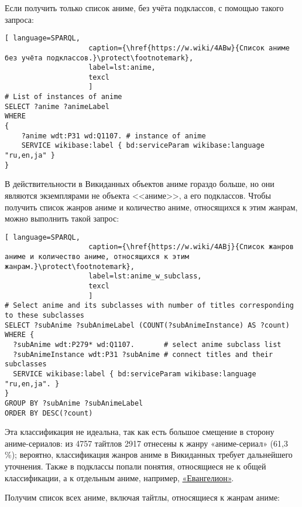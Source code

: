 Если получить только список аниме, без учёта подклассов, с помощью такого запроса:

\begin{lstlisting}[ language=SPARQL, 
                    caption={\href{https://w.wiki/4ABw}{Список аниме без учёта подклассов.}\protect\footnotemark},
                    label=lst:anime,
                    texcl 
                    ]
# List of instances of anime
SELECT ?anime ?animeLabel
WHERE
{
    ?anime wdt:P31 wd:Q1107. # instance of anime
    SERVICE wikibase:label { bd:serviceParam wikibase:language "ru,en,ja" }
}
\end{lstlisting}%

В действительности в Викиданных объектов аниме гораздо больше, но они являются экземплярами не объекта <<аниме>>, а его подклассов. Чтобы получить список жанров аниме и количество аниме, относящихся к этим жанрам, можно выполнить такой запрос:

\begin{lstlisting}[ language=SPARQL, 
                    caption={\href{https://w.wiki/4ABj}{Список жанров аниме и количество аниме, относящихся к этим жанрам.}\protect\footnotemark},
                    label=lst:anime_w_subclass,
                    texcl 
                    ]
# Select anime and its subclasses with number of titles corresponding to these subclasses
SELECT ?subAnime ?subAnimeLabel (COUNT(?subAnimeInstance) AS ?count) WHERE {
  ?subAnime wdt:P279* wd:Q1107.       # select anime subclass list
  ?subAnimeInstance wdt:P31 ?subAnime # connect titles and their subclasses
  SERVICE wikibase:label { bd:serviceParam wikibase:language "ru,en,ja". }
}
GROUP BY ?subAnime ?subAnimeLabel
ORDER BY DESC(?count)
\end{lstlisting}%

Эта классификация не идеальна, так как есть большое смещение в сторону аниме-сериалов: из 4757 тайтлов 2917 отнесены к жанру «аниме-сериал» (61,3 \%); вероятно, классификация жанров аниме в Викиданных требует дальнейшего уточнения. Также в подклассы попали понятия, относящиеся не к общей классификации, а к отдельным аниме, например, \href{https://clck.ru/9cFfS}{«Евангелион»}.

Получим список всех аниме, включая тайтлы, относящиеся к жанрам аниме:

